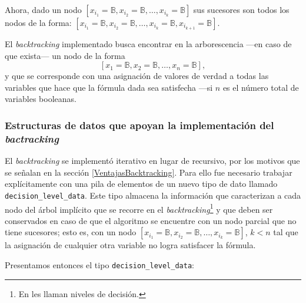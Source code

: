 \documentclass[12pt,lettersize,oneside]{article}
\begin{document}
Ahora, dado un nodo $[x_{i_1}=\mathbb{B},x_{i_2}=\mathbb{B},\ldots, x_{i_k} =
\mathbb{B} ]$ sus sucesores son todos los nodos de la forma:
$[x_{i_1}=\mathbb{B},x_{i_2}=\mathbb{B},\ldots, x_{i_k} = \mathbb{B},
x_{i_{k+1}}=\mathbb{B} ]$.

El \emph{backtracking} implementado busca encontrar en la arborescencia ---en
caso de que exista--- un nodo de la forma
\[[x_{1}=\mathbb{B},x_{2}=\mathbb{B},\ldots, x_{n} = \mathbb{B} ], \] y que se
corresponde con una asignación de valores de verdad a todas las variables que
hace que la fórmula dada sea satisfecha ---si $n$ es el número total de
variables booleanas.
\vspace{-2.5mm}

\subsubsection{Estructuras de datos que apoyan la implementación del \emph{bactracking}}
El \emph{backtracking} se implementó iterativo en lugar de recursivo, por los
motivos que se señalan en la sección \ref{VentajasBacktracking}. Para ello fue
necesario trabajar explícitamente con una pila de elementos de un nuevo tipo de
dato llamado {\tt decision\_level\_data}. Este tipo almacena la información que
caracterizan a cada nodo del árbol implícito que se recorre en el
\emph{backtracking}\footnote{En \cite{Zhang} les llaman niveles de decisión.} y
que deben ser conservados en caso de que el algoritmo se encuentre con un nodo
parcial que no tiene sucesores; esto es, con un nodo
$[x_{i_1}=\mathbb{B},x_{i_2}=\mathbb{B},\ldots, x_{i_k} = \mathbb{B} ]$, $k< n$
tal que la asignación de cualquier otra variable no logra satisfacer la fórmula.

Presentamos entonces el tipo {\tt decision\_level\_data}:
\end{document}
